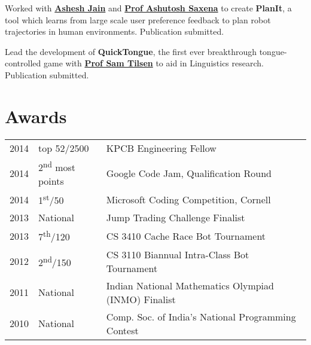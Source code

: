 \documentclass[a4paper]{resume}
\begin{document}
\begin{minipage}[t]{0.66\textwidth}

Worked with \textbf{\href{http://www.cs.cornell.edu/~ashesh/}{Ashesh Jain}} and \textbf{\href{http://www.cs.cornell.edu/~asaxena/}{Prof Ashutosh Saxena}} to create \textbf{PlanIt}, a tool which learns from large scale user preference feedback to plan robot trajectories in human environments. Publication submitted.

\sectionspace %



Lead the development of \textbf{QuickTongue}, the first ever breakthrough tongue-controlled game with \textbf{\href{http://conf.ling.cornell.edu/~tilsen/}{Prof Sam Tilsen}} to aid in Linguistics research. Publication submitted.

\sectionspace %


\section{Awards} 

\begin{tabular}{rll}
2014	 & top 52/2500 & KPCB Engineering Fellow\\
2014	 & 2\textsuperscript{nd} most points & Google Code Jam, Qualification Round\\
2014	 & 1\textsuperscript{st}/50 & Microsoft Coding Competition, Cornell\\
2013	 & National & Jump Trading Challenge Finalist\\
2013 & 7\textsuperscript{th}/120 & CS 3410 Cache Race Bot Tournament \\
2012 & 2\textsuperscript{nd}/150 & CS 3110 Biannual Intra-Class Bot Tournament \\
2011 & National & Indian National Mathematics Olympiad (INMO) Finalist \\
2010 & National & Comp. Soc. of India's National Programming Contest\\
\end{tabular}


\end{minipage}
\end{document}
